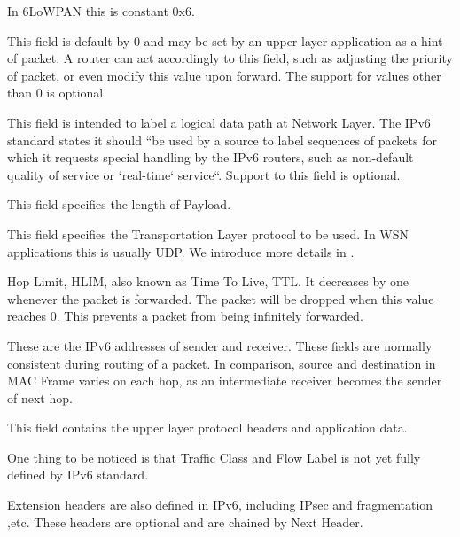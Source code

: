 \begin{description}[style=nextline]
	\item[\textbf{Version}]
	In 6LoWPAN this is constant 0x6.
	\item[\textbf{Traffic Class}]
	This field is default by 0 and may be set by an upper layer application as a hint of packet. A router can act accordingly to this field, such as adjusting the priority of packet, or even modify this value upon forward. The support for values other than $0$ is optional.
	\item[\textbf{Flow Label}]
	This field is intended to label a logical data path at Network Layer. The IPv6 standard\cite{rfc2460} states  it should ``be used by a source to label sequences of packets for which it requests special handling by the IPv6 routers, such as non-default quality of service or `real-time` service``. Support to this field is optional.
	\item[\textbf{Payload Length}]
	This field specifies the length of Payload.
	\item[\textbf{Next Header}]
	This field specifies the Transportation Layer protocol to be used. In WSN applications this is usually UDP. We introduce more details in .
	\item[\textbf{Hop Limit}]
	Hop Limit, HLIM, also known as Time To Live, TTL. It decreases by one whenever the packet is forwarded. The packet will be dropped when this value reaches $0$. This prevents a packet from being infinitely forwarded.
	\item[\textbf{Source Address and Destination Address}]
	These are the IPv6 addresses of sender and receiver. These fields are normally consistent during routing of a packet. In comparison, source and destination in MAC Frame varies on each hop, as an intermediate receiver becomes the sender of next hop.
	\item[\textbf{Payload}]
	This field contains the upper layer protocol headers and application data.
\end{description}

One thing to be noticed is that Traffic Class and Flow Label is not yet fully defined by IPv6 standard\cite{rfc2460}. 

Extension headers are also defined in IPv6\cite{rfc2460}, including IPsec and fragmentation ,etc. These headers are optional and are chained by Next Header.

